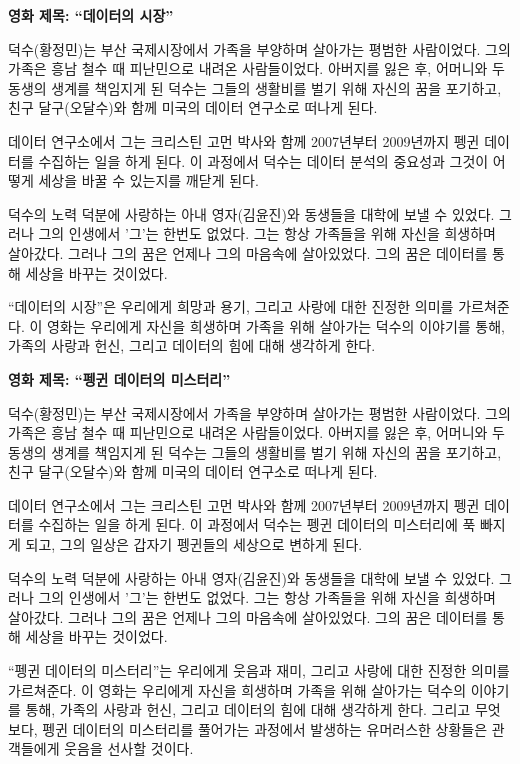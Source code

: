 \documentclass[
  letterpaper,
]{book}
\begin{document}
\begin{tcolorbox}
\textbf{영화 제목: ``데이터의 시장''}

덕수(황정민)는 부산 국제시장에서 가족을 부양하며 살아가는 평범한
사람이었다. 그의 가족은 흥남 철수 때 피난민으로 내려온 사람들이었다.
아버지를 잃은 후, 어머니와 두 동생의 생계를 책임지게 된 덕수는 그들의
생활비를 벌기 위해 자신의 꿈을 포기하고, 친구 달구(오달수)와 함께 미국의
데이터 연구소로 떠나게 된다.

데이터 연구소에서 그는 크리스틴 고먼 박사와 함께 2007년부터 2009년까지
펭귄 데이터를 수집하는 일을 하게 된다. 이 과정에서 덕수는 데이터 분석의
중요성과 그것이 어떻게 세상을 바꿀 수 있는지를 깨닫게 된다.

덕수의 노력 덕분에 사랑하는 아내 영자(김윤진)와 동생들을 대학에 보낼 수
있었다. 그러나 그의 인생에서 '그'는 한번도 없었다. 그는 항상 가족들을
위해 자신을 희생하며 살아갔다. 그러나 그의 꿈은 언제나 그의 마음속에
살아있었다. 그의 꿈은 데이터를 통해 세상을 바꾸는 것이었다.

``데이터의 시장''은 우리에게 희망과 용기, 그리고 사랑에 대한 진정한
의미를 가르쳐준다. 이 영화는 우리에게 자신을 희생하며 가족을 위해
살아가는 덕수의 이야기를 통해, 가족의 사랑과 헌신, 그리고 데이터의 힘에
대해 생각하게 한다.

\textbf{영화 제목: ``펭귄 데이터의 미스터리''}

덕수(황정민)는 부산 국제시장에서 가족을 부양하며 살아가는 평범한
사람이었다. 그의 가족은 흥남 철수 때 피난민으로 내려온 사람들이었다.
아버지를 잃은 후, 어머니와 두 동생의 생계를 책임지게 된 덕수는 그들의
생활비를 벌기 위해 자신의 꿈을 포기하고, 친구 달구(오달수)와 함께 미국의
데이터 연구소로 떠나게 된다.

데이터 연구소에서 그는 크리스틴 고먼 박사와 함께 2007년부터 2009년까지
펭귄 데이터를 수집하는 일을 하게 된다. 이 과정에서 덕수는 펭귄 데이터의
미스터리에 푹 빠지게 되고, 그의 일상은 갑자기 펭귄들의 세상으로 변하게
된다.

덕수의 노력 덕분에 사랑하는 아내 영자(김윤진)와 동생들을 대학에 보낼 수
있었다. 그러나 그의 인생에서 '그'는 한번도 없었다. 그는 항상 가족들을
위해 자신을 희생하며 살아갔다. 그러나 그의 꿈은 언제나 그의 마음속에
살아있었다. 그의 꿈은 데이터를 통해 세상을 바꾸는 것이었다.

``펭귄 데이터의 미스터리''는 우리에게 웃음과 재미, 그리고 사랑에 대한
진정한 의미를 가르쳐준다. 이 영화는 우리에게 자신을 희생하며 가족을 위해
살아가는 덕수의 이야기를 통해, 가족의 사랑과 헌신, 그리고 데이터의 힘에
대해 생각하게 한다. 그리고 무엇보다, 펭귄 데이터의 미스터리를 풀어가는
과정에서 발생하는 유머러스한 상황들은 관객들에게 웃음을 선사할 것이다.

\end{tcolorbox}
\end{document}

